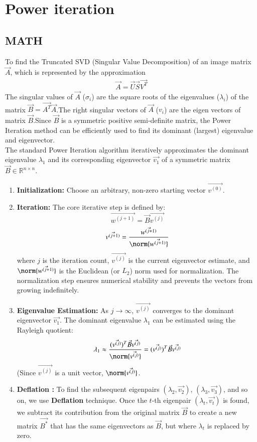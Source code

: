\documentclass[journal,12pt,onecolumn]{IEEEtran}
\theoremstyle{remark}
\begin{document}
\section{\textbf{Power iteration}}
\vspace{1em}
\subsection{MATH}
\vspace{1em}
\begin{justify}

To find the Truncated SVD (Singular Value Decomposition) of an image matrix $\vec{A}$, which is represented by the approximation
\begin{align*}
         \vec{A} = \vec{U}\vec{S}\vec{V^T}
     \end{align*}
The singular values of $\vec{A}$ ($\sigma_i$) are the square roots of the eigenvalues ($\lambda_i$) of the matrix $\vec{B} = \vec{A^T}\vec{A}$.The right singular vectors of $\vec{A}$ ($v_i$) are the eigen vectors of matrix $\vec{B} $.Since $\vec{B}$ is a symmetric positive semi-definite matrix, the Power Iteration method can be efficiently used to find its dominant (largest) eigenvalue and eigenvector.\\
The standard Power Iteration algorithm iteratively approximates the dominant eigenvalue $\lambda_1$ and its corresponding eigenvector $\vec{v_1}$ of a symmetric matrix $\vec{B} \in \mathbb{R}^{n \times n}$.

\begin{enumerate}
    \item \textbf{Initialization:} Choose an arbitrary, non-zero starting vector $\vec{v^{(0)}}$.
    \item \textbf{Iteration:} The core iterative step is defined by:
    $$
    \vec{w^{(j+1)}} = \vec{B} \vec{v^{(j)}}
    $$
    $$
    \vec{v^{(j+1)}} = \frac{\vec{w^{(j+1)}}}{\norm{\vec{w^{(j+1)}}}}
    $$
    where $j$ is the iteration count, $\vec{v^{(j)}}$ is the current eigenvector estimate, and $\norm{\vec{w^{(j+1)}}}$ is the Euclidean (or $L_2$) norm used for normalization. The normalization step ensures numerical stability and prevents the vectors from growing indefinitely.
    \item \textbf{Eigenvalue Estimation:} As $j \to \infty$, $\vec{v^{(j)}}$ converges to the dominant eigenvector $\vec{v_1}$. The dominant eigenvalue $\lambda_1$ can be estimated using the Rayleigh quotient:
    $$
    \lambda_1 \approx \frac{(\vec{v^{(j)}})^T \vec{B} \vec{v^{(j)}}}{\norm{\vec{v^{(j)}}}} = (\vec{v^{(j)}})^T \vec{B} \vec{v^{(j)}}
    $$
    (Since $\vec{v^{(j)}}$ is a unit vector, $\norm{\vec{v^{(j)}}}$.
    \item\textbf{Deflation :}
    To find the subsequent eigenpairs $(\lambda_2, \vec{v_2})$, $(\lambda_3, \vec{v_3})$, and so on, we use \textbf{Deflation} technique. Once the $t$-th eigenpair $(\lambda_t, \vec{v_t})$ is found, we subtract its contribution from the original matrix $\vec{B}$ to create a new matrix $\vec{B^*}$ that has the same eigenvectors as $\vec{B}$, but where $\lambda_t$ is replaced by zero.


\end{enumerate}
\end{justify}
\end{document}
